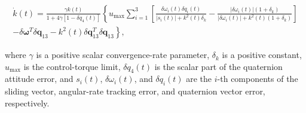 \begin{multline}
    \dot{k}(t)
    =
    \frac{
        \gamma k(t)
    }{
        1
        +
        4\gamma
        \left[
            1-\delta q_{4}(t)
        \right]
    }
    \left\{
    u_{\max}
    \sum_{i=1}^{3}
    \left[
        \frac{
            \delta\omega_i(t)\delta q_i(t)
        }{
            |s_i(t)| + k^2(t)\delta_k
        }
        -
        \frac{
            |\delta\omega_i(t)|(1+\delta_k)
        }{
            |\delta\omega_i(t)| + k^2(t)(1+\delta_k)
        }
    \right]
    \right. \\
    \left.
    -
    \delta\boldsymbol{\omega}^{T}
    \delta\mathbf{q}_{13}
    -
    k^2(t)
    \delta\mathbf{q}_{13}^{T}
    \delta\mathbf{q}_{13}
    \right\},
    \label{eq:app_adcs_boskovic_adaptive_gain}
\end{multline}

where \(\gamma\) is a positive scalar convergence-rate parameter, \(\delta_k\) is a positive constant, \(u_{\max}\) is the control-torque limit, \(\delta q_4(t)\) is the scalar part of the quaternion attitude error, and \(s_i(t)\), \(\delta\omega_i(t)\), and \(\delta q_i(t)\) are the \(i\)-th components of the sliding vector, angular-rate tracking error, and quaternion vector error, respectively.






